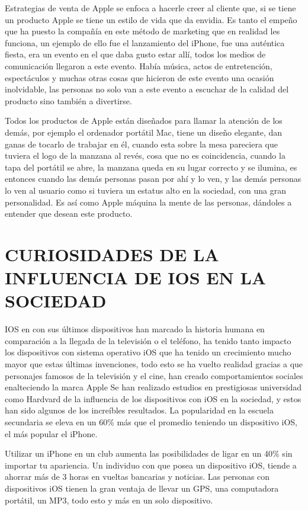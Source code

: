 Estrategias de venta de Apple se enfoca a hacerle creer al
cliente que, si se tiene un producto Apple se tiene un estilo de
vida que da envidia.
Es tanto el empeño que ha puesto la compañía en este método
de marketing que en realidad les funciona, un ejemplo de ello
fue el lanzamiento del iPhone, fue una auténtica fiesta, era un
evento en el que daba gusto estar allí, todos los medios de
comunicación llegaron a este evento. Había música, actos de
entretención, espectáculos y muchas otras cosas que hicieron de
este evento una ocasión inolvidable, las personas no solo van a
este evento a escuchar de la calidad del producto sino también a
divertirse.

Todos los productos de Apple están diseñados para llamar la
atención de los demás, por ejemplo el ordenador portátil Mac,
tiene un diseño elegante, dan ganas de tocarlo de trabajar en él,
cuando esta sobre la mesa pareciera que tuviera el logo de la
manzana al revés, cosa que no es coincidencia, cuando la tapa
del portátil se abre, la manzana queda en su lugar correcto y se
ilumina, es entonces cuando las demás personas pasan por ahí y
lo ven, y las demás personas lo ven al usuario como si tuviera un
estatus alto en la sociedad, con una gran personalidad. Es así
como Apple máquina la mente de las personas, dándoles a
entender que desean este producto.

\section*{CURIOSIDADES DE LA INFLUENCIA DE IOS EN LA SOCIEDAD}

IOS en con sus últimos dispositivos han marcado la historia
humana en comparación a la llegada de la televisión o el
teléfono, ha tenido tanto impacto los dispositivos con sistema
operativo iOS que ha tenido un crecimiento mucho mayor que
estas últimas invenciones, todo esto se ha vuelto realidad
gracias a que personajes famosos de la televisión y el cine, han
creado comportamientos sociales enalteciendo la marca Apple
Se han realizado estudios en prestigiosas universidad como
Hardvard de la influencia de los dispositivos con iOS en la
sociedad, y estos han sido algunos de los increíbles resultados.
La popularidad en la escuela secundaria se eleva en un 60\% más
que el promedio teniendo un dispositivo iOS, el más popular el
iPhone.

Utilizar un iPhone en un club aumenta las posibilidades de ligar
en un 40\% sin importar tu apariencia.
Un individuo con que posea un dispositivo iOS, tiende a ahorrar
más de 3 horas en vueltas bancarias y noticias.
Las personas con dispositivos iOS tienen la gran ventaja de
llevar un GPS, una computadora portátil, un MP3, todo esto y
más en un solo dispositivo.

